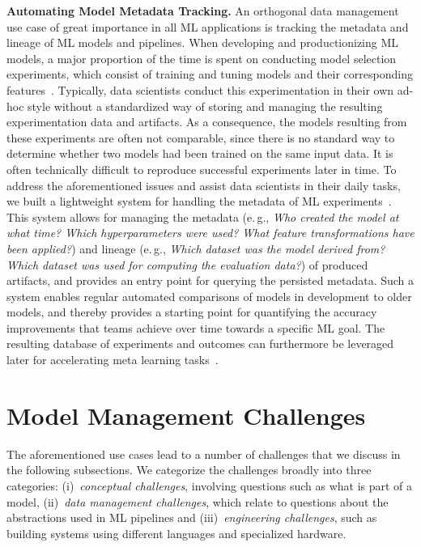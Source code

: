\documentclass[11pt]{article}
\newcommand{\hdr}[1]{\noindent\textbf{#1.}}
\begin{document}
\hdr{Automating Model Metadata Tracking} An orthogonal data management use case of great importance in all ML applications is tracking the metadata and lineage of ML models and pipelines. When developing and productionizing ML models, a major proportion of the time is spent on conducting model selection experiments, which consist of training and tuning models and their corresponding features~\cite{Sculley2015,Bose2017,Kumar2015,Polyzotis2017,Zinkevich2017,Baylor2017}. Typically, data scientists conduct this experimentation in their own ad-hoc style without a standardized way of storing and managing the resulting experimentation data and artifacts. As a consequence, the models resulting from these experiments are often not comparable, since there is no standard way to determine whether two models had been trained on the same input data. It is often technically difficult to reproduce successful experiments later in time. To address the aforementioned issues and assist data scientists in their daily tasks, we built a lightweight system for handling the metadata of ML experiments~\cite{Schelter2017}. This system allows for managing the metadata (e.\,g., \textit{Who created the model at what time? Which hyperparameters were used? What feature transformations have been applied?}) and lineage (e.\,g., \textit{Which dataset was the model derived from? Which dataset was used for computing the evaluation data?}) of produced artifacts, and provides an entry point for querying the persisted metadata. Such a system enables regular automated comparisons of models in development to older models, and thereby provides a starting point for quantifying the accuracy improvements that teams achieve over time towards a specific ML goal. The resulting database of experiments and outcomes can furthermore be leveraged later for accelerating meta learning tasks~\cite{Feurer2015}.\\

\section{Model Management Challenges}
\label{sec:challenges}

The aforementioned use cases lead to a number of challenges that we discuss in the following subsections. We categorize the challenges broadly into three categories: (i)~\textit{conceptual challenges}, involving questions such as what is part of a model, (ii)~\textit{data management challenges}, which relate to questions about the abstractions used in ML pipelines and (iii)~\textit{engineering challenges}, such as building systems using different languages and specialized hardware.
\end{document}
